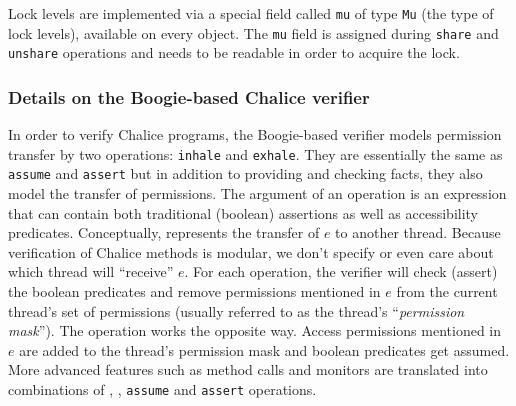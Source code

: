 Lock levels are implemented via a special field called \lstinline!mu! of type \lstinline!Mu! (the type of lock levels), available on every object. 
The \lstinline!mu! field is assigned during \lstinline[language=Chalice]!share! and \lstinline[language=Chalice]!unshare! operations and needs to be readable in order to acquire the lock.

\subsubsection{Details on the Boogie-based Chalice verifier}
In order to verify Chalice programs, the Boogie-based verifier models permission transfer by two operations: \lstinline[language=SIL]!inhale! and \lstinline[language=SIL]!exhale!. 
They are essentially the same as \lstinline[language=SIL]!assume! and \lstinline[language=SIL]!assert! but in addition to providing and checking facts, they also model the transfer of permissions.
The argument of an \exhale{} operation is an expression that can contain both traditional (boolean) assertions as well as accessibility predicates. 
Conceptually,  represents the transfer of $e$ to another thread. 
Because verification of Chalice methods is modular, we don't specify or even care about which thread will ``receive'' $e$.
For each \exhale operation, the verifier will check (assert) the boolean predicates and remove permissions mentioned in $e$ from the current thread's set of permissions (usually referred to as the thread's ``\emph{permission mask}'').
The  operation works the opposite way. Access permissions mentioned in $e$ are added to the thread's permission mask and boolean predicates get assumed. More advanced features such as method calls and monitors are translated into combinations of \inhale{}, \exhale{}, \lstinline[language=Chalice]!assume! and \lstinline[language=Chalice]!assert! operations.
